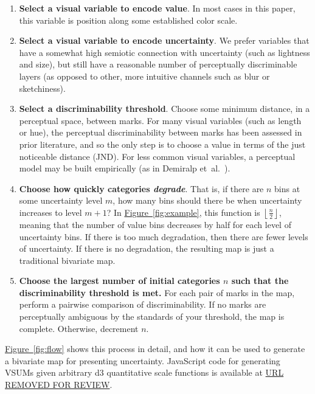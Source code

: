 \documentclass{vgtc}                          %
\newcommand{\figref}[1]{\hyperref[#1]{Figure~\ref*{#1}}}
\newcommand{\ea}{{et~al.}\xspace}
\begin{document}
\begin{enumerate}
	\item \textbf{Select a visual variable to encode value}. In most cases in this paper, this variable is position along some established color scale.
	\item \textbf{Select a visual variable to encode uncertainty}. We prefer variables that have a somewhat high semiotic connection with uncertainty (such as lightness and size), but still have a reasonable number of perceptually discriminable layers (as opposed to other, more intuitive channels such as blur or sketchiness).
	\item \textbf{Select a discriminability threshold}. Choose some minimum distance, in a perceptual space, between marks. For many visual variables (such as length or hue), the perceptual discriminability between marks has been assessed in prior literature, and so the only step is to choose a value in terms of the just noticeable distance (JND). For less common visual variables, a perceptual model may be built empirically (as in Demiralp \ea~\cite{demiralp2014learning}).
	\item \textbf{Choose how quickly categories \emph{degrade}}. That is, if there are $n$ bins at some uncertainty level $m$, how many bins should there be when uncertainty increases to level $m+1$? In \figref{fig:example}, this function is $\left \lfloor {\frac{n}{2}}\right \rfloor$, meaning that the number of value bins decreases by half for each level of uncertainty bins. If there is too much degradation, then there are fewer levels of uncertainty. If there is no degradation, the resulting map is just a traditional bivariate map.
	\item \textbf{Choose the largest number of initial categories $n$ such that the discriminability threshold is met.} For each pair of marks in the map, perform a pairwise comparison of discriminability. If no marks are perceptually ambiguous by the standards of your threshold, the map is complete. Otherwise, decrement $n$.
\end{enumerate}

\figref{fig:flow} shows this process in detail, and how it can be used to generate a bivariate map for presenting uncertainty. JavaScript code for generating VSUMs given arbitrary d3 quantitative scale functions is available at \url{URL REMOVED FOR REVIEW}.
\end{document}
